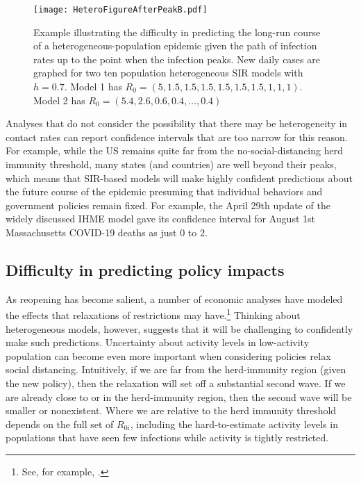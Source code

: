 \documentclass[11pt]{article}
\begin{document}
\begin{figure}[htbp]
\noindent
\begin{center}
\texttt{[image: HeteroFigureAfterPeakB.pdf]}
\end{center}
\caption{Example illustrating the difficulty in predicting the long-run course of a heterogeneous-population epidemic given the path of infection rates up to
the point when the infection peaks. New daily cases are graphed for two ten population heterogeneous SIR models with $h=0.7$. Model 1 has $R_0 = (5, 1.5, 1.5, 1.5, 1.5, 1.5, 1.5, 1, 1, 1)$. Model 2 has 
$R_0=(5.4, 2.6, 0.6, 0.4, \ldots, 0.4)$}
\label{f:weakidentification}
\end{figure}

Analyses that do not consider the possibility that there may be heterogeneity in contact rates can report confidence intervals that are too narrow for this reason. For example, while the US remains quite far from the no-social-distancing herd immunity threshold, many states (and countries) are well
beyond their peaks, which means that SIR-based models will make highly confident predictions about the future course of the epidemic
presuming that individual behaviors and government policies remain fixed. For example, the April 29th update of the widely discussed IHME model gave its confidence interval 
for August 1st Massachusetts COVID-19 deaths as just 0 to 2. 

\subsection{Difficulty in predicting policy impacts}

As reopening has become salient, a number of economic analyses have
modeled the effects that relaxations of restrictions may have.\footnote{See, for example, \citet{baqaee2020reopening}.} Thinking about heterogeneous models, however, suggests that it will be challenging to confidently make such predictions. Uncertainty about activity levels in low-activity
population can become even more important when considering policies 
relax social distancing. Intuitively, if we are far from the herd-immunity region (given the new policy), then the relaxation will set off  a substantial second wave. If we are already 
close to or in the herd-immunity
region, then the second wave will be smaller or
nonexistent. Where we are relative to 
the herd immunity threshold depends on
the full set of $R_{0i}$, including the hard-to-estimate activity levels in populations that
have seen few infections while activity is tightly restricted.
\end{document}
